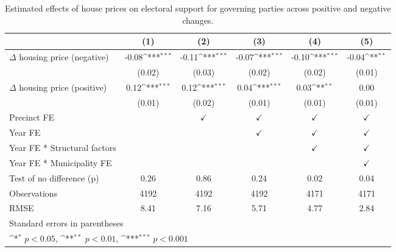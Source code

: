 \begin{table}[htbp]\centering
\def\sym#1{\ifmmode^{#1}\else\(^{#1}\)\fi}
\caption{Estimated effects of house prices on electoral support for governing parties across positive and negative changes.} \label{tab4}
\begin{tabular}{l*{5}{c}}
\hline\hline
                    &\multicolumn{1}{c}{(1)}         &\multicolumn{1}{c}{(2)}         &\multicolumn{1}{c}{(3)}         &\multicolumn{1}{c}{(4)}         &\multicolumn{1}{c}{(5)}         \\
\hline
$\Delta$ housing price (negative)&       -0.08\sym{***}&       -0.11\sym{***}&       -0.07\sym{***}&       -0.10\sym{***}&       -0.04\sym{**} \\
                    &      (0.02)         &      (0.03)         &      (0.02)         &      (0.02)         &      (0.01)         \\
[1em]
$\Delta$ housing price (positive)&        0.12\sym{***}&        0.12\sym{***}&        0.04\sym{***}&        0.03\sym{**} &        0.00         \\
                    &      (0.01)         &      (0.02)         &      (0.01)         &      (0.01)         &      (0.01)         \\
[1em]
\hline Precinct  FE &                     &$\checkmark$         &$\checkmark$         &$\checkmark$         &$\checkmark$         \\
[1em]
Year FE             &                     &                     &$\checkmark$         &$\checkmark$         &$\checkmark$         \\
[1em]
Year FE * Structural factors&                     &                     &                     &$\checkmark$         &$\checkmark$         \\
[1em]
Year FE * Municipality FE&                     &                     &                     &                     &$\checkmark$         \\
\hline
Test of no difference (p)&        0.26         &        0.86         &        0.24         &        0.02         &        0.04         \\
Observations        &        4192         &        4192         &        4192         &        4171         &        4171         \\
RMSE                &        8.41         &        7.16         &        5.71         &        4.77         &        2.84         \\
\hline\hline
\multicolumn{6}{l}{\footnotesize Standard errors in parentheses}\\
\multicolumn{6}{l}{\footnotesize \sym{*} \(p<0.05\), \sym{**} \(p<0.01\), \sym{***} \(p<0.001\)}\\
\end{tabular}
\end{table}
